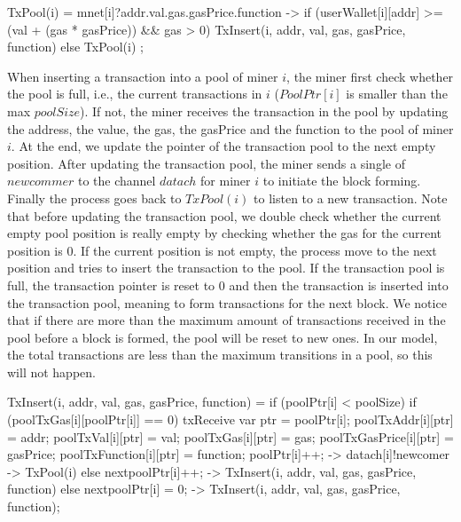 \documentclass{KERauth}
\begin{document}
\begin{center}
\begin{boxedverbatim}
TxPool(i) =
  mnet[i]?addr.val.gas.gasPrice.function ->
  if (userWallet[i][addr] >= (val + (gas * gasPrice)) && gas > 0)
        {TxInsert(i, addr, val, gas, gasPrice, function) }
  else {TxPool(i) };
\end{boxedverbatim}
\end{center}

When inserting a transaction into a pool of miner $i$, the miner first check whether the pool is full, i.e., the current transactions in $i$ ($PoolPtr[i]$ is smaller than the max $poolSize$). If not, the miner receives the transaction in the pool by updating the address, the value, the gas, the gasPrice and the function to the pool of miner $i$. At the end, we update the pointer of the transaction pool to the next empty position. After
updating the transaction pool, the miner sends a single of $newcommer$ to the channel $datach$ for miner $i$ to initiate the block forming. Finally the process goes back to $TxPool(i)$ to listen to a new transaction. Note that before updating the transaction pool, we double check whether the current empty pool position is really empty by checking whether the gas for the current position is $0$. If the current position is not empty, the process move to the next position and tries to insert the transaction to the pool. If the transaction pool is full, the transaction pointer is reset to $0$ and then the transaction is inserted into the transaction pool, meaning to form transactions for the next block. We notice that if there are more than the maximum amount of transactions received in the pool before a block is formed, the pool will be reset to new ones. In our model, the total transactions are less than the maximum transitions in a pool, so this will not happen.

\begin{center}
\begin{boxedverbatim}
TxInsert(i, addr, val, gas, gasPrice, function) =
  if (poolPtr[i] < poolSize) {
    if (poolTxGas[i][poolPtr[i]] == 0) {
      txReceive{
        var ptr = poolPtr[i];
        poolTxAddr[i][ptr] = addr;
        poolTxVal[i][ptr] = val;
        poolTxGas[i][ptr] = gas;
        poolTxGasPrice[i][ptr] = gasPrice;
        poolTxFunction[i][ptr] = function;
        poolPtr[i]++;} ->
      datach[i]!newcomer ->
      TxPool(i) }
    else {
      next{poolPtr[i]++;} ->
      TxInsert(i, addr, val, gas, gasPrice, function) } }
  else {
    next{poolPtr[i] = 0;} ->
    TxInsert(i, addr, val, gas, gasPrice, function)};
\end{boxedverbatim}
\end{center}
\end{document}

